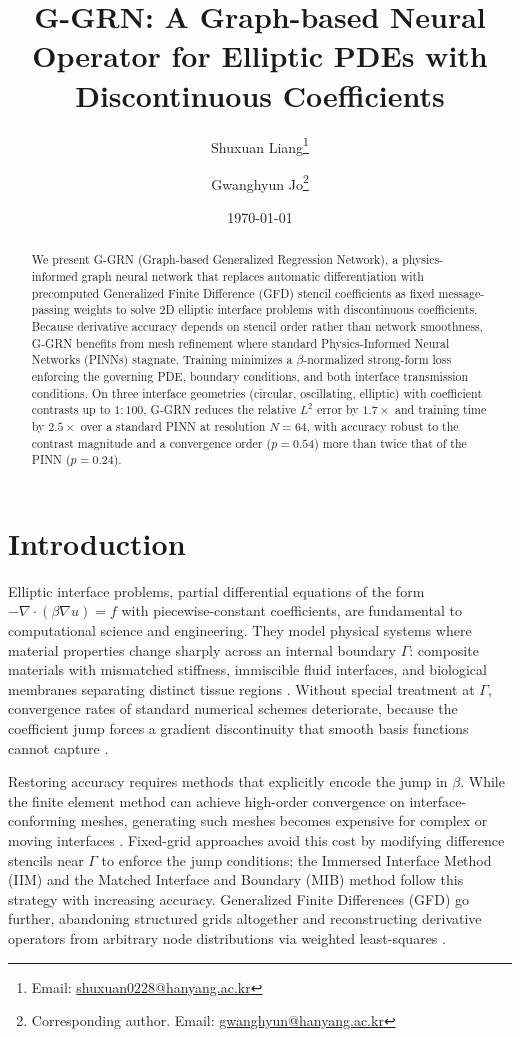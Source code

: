 \documentclass[11pt]{article}
\title{G-GRN: A Graph-based Neural Operator for Elliptic PDEs with Discontinuous Coefficients}
\author[1]{Shuxuan Liang\thanks{Email: \href{mailto:shuxuan0228@hanyang.ac.kr}{shuxuan0228@hanyang.ac.kr}}}
\author[1]{Gwanghyun Jo\thanks{Corresponding author. Email: \href{mailto:gwanghyun@hanyang.ac.kr}{gwanghyun@hanyang.ac.kr}}}
\affil[1]{Department of Applied Mathematics, Hanyang University}
\date{\today}
\theoremstyle{definition}
\theoremstyle{remark}
\theoremstyle{plain}
\begin{document}
\maketitle

\begin{abstract}
We present G-GRN (Graph-based Generalized Regression Network), a physics-informed graph neural network that replaces automatic differentiation with precomputed Generalized Finite Difference (GFD) stencil coefficients as fixed message-passing weights to solve 2D elliptic interface problems with discontinuous coefficients. Because derivative accuracy depends on stencil order rather than network smoothness, G-GRN benefits from mesh refinement where standard Physics-Informed Neural Networks (PINNs) stagnate. Training minimizes a $\beta$-normalized strong-form loss enforcing the governing PDE, boundary conditions, and both interface transmission conditions. On three interface geometries (circular, oscillating, elliptic) with coefficient contrasts up to $1{:}100$, G-GRN reduces the relative $L^2$ error by $1.7\times$ and training time by $2.5\times$ over a standard PINN at resolution $N=64$, with accuracy robust to the contrast magnitude and a convergence order ($p=0.54$) more than twice that of the PINN ($p=0.24$).
\end{abstract}

\section{Introduction}
\label{sec:introduction}

Elliptic interface problems, partial differential equations of the form $-\nabla\cdot(\beta\nabla u) = f$ with piecewise-constant coefficients, are fundamental to computational science and engineering. They model physical systems where material properties change sharply across an internal boundary $\Gamma$: composite materials with mismatched stiffness, immiscible fluid interfaces, and biological membranes separating distinct tissue regions \cite{peskin2002immersed, leveque1994immersed}. Without special treatment at $\Gamma$, convergence rates of standard numerical schemes deteriorate, because the coefficient jump forces a gradient discontinuity that smooth basis functions cannot capture \cite{babuvska1970finite, li2006immersed}.

Restoring accuracy requires methods that explicitly encode the jump in $\beta$. While the finite element method can achieve high-order convergence on interface-conforming meshes, generating such meshes becomes expensive for complex or moving interfaces \cite{babuvska1970finite}. Fixed-grid approaches avoid this cost by modifying difference stencils near $\Gamma$ to enforce the jump conditions; the Immersed Interface Method (IIM) \cite{leveque1994immersed} and the Matched Interface and Boundary (MIB) method \cite{zhou2006fictitious} follow this strategy with increasing accuracy. Generalized Finite Differences (GFD) go further, abandoning structured grids altogether and reconstructing derivative operators from arbitrary node distributions via weighted least-squares \cite{liszka1980finite, benito2001influence}.
\end{document}
